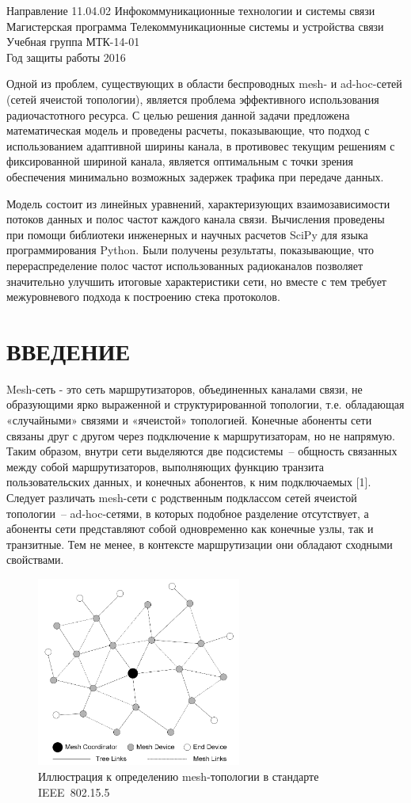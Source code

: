 \documentclass[14pt,a4paper,titlepage]{extarticle}
\newcommand{\nnumsection}[1]{%
	\clearpage
	\addcontentsline{toc}{section}{#1}
	\section*{#1}
}
\begin{document}
Направление 11.04.02 Инфокоммуникационные технологии и системы связи \\
Магистерская программа Телекоммуникационные системы и устройства связи \\
Учебная группа МТК-14-01 \\
Год защиты работы 2016 \\
\par
Одной из проблем, существующих в области беспроводных mesh- и ad-hoc-сетей (сетей ячеистой топологии), является проблема эффективного использования радиочастотного ресурса. С целью решения данной задачи предложена математическая модель и проведены расчеты, показывающие, что подход с использованием адаптивной ширины канала, в противовес текущим решениям с фиксированной шириной канала, является оптимальным с точки зрения обеспечения минимально возможных задержек трафика при передаче данных. 

Модель состоит из линейных уравнений, характеризующих взаимозависимости потоков данных и полос частот каждого канала связи. Вычисления проведены при помощи библиотеки инженерных и научных расчетов SciPy для языка программирования Python. Были получены результаты, показывающие, что перераспределение полос частот использованных радиоканалов позволяет значительно улучшить итоговые характеристики сети, но вместе с тем требует межуровневого подхода к построению стека протоколов. 

\tableofcontents
\nnumsection{ВВЕДЕНИЕ}
Mesh-сеть - это сеть маршрутизаторов, объединенных каналами связи, не образующими ярко выраженной и структурированной топологии, т.е. обладающая «случайными» связями и «ячеистой» топологией. Конечные абоненты сети связаны друг с другом через подключение к маршрутизаторам, но не напрямую. Таким образом, внутри сети выделяются две подсистемы~-- общность связанных между собой маршрутизаторов, выполняющих функцию транзита пользовательских данных, и конечных абонентов, к ним подключаемых [1]. Следует различать mesh-сети с родственным подклассом сетей ячеистой топологии~-- ad-hoc-сетями, в которых подобное разделение отсутствует, а абоненты сети представляют собой одновременно как конечные узлы, так и транзитные. Тем не менее, в контексте маршрутизации они обладают сходными свойствами.

\begin{figure}[h]
	\centering
	\includegraphics[width=0.6\textwidth]{802_15_5_mesh_topology}
	\caption{Иллюстрация к определению mesh-топологии в стандарте IEEE~802.15.5}
	\label{fig:mesh_topology}
\end{figure}
\end{document}
